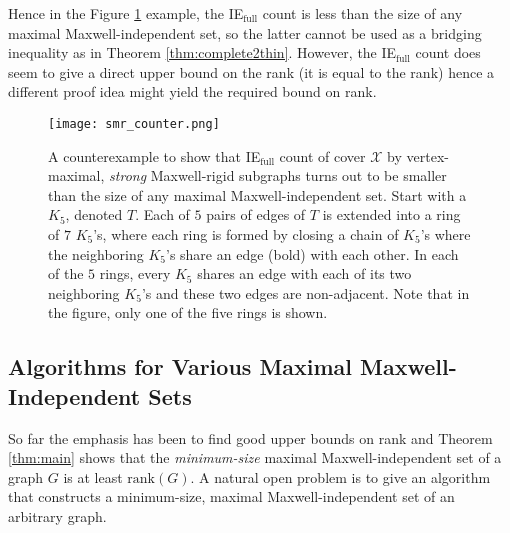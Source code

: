 \documentclass[10pt]{article}
\def\X{\mathcal {X}}
\begin{document}
\medskip\noindent 
Hence in the Figure \ref{smr_counter} example, the IE$_{\text{full}}$ count is less than the size of any maximal Maxwell-independent set, so the latter cannot be used as a bridging inequality
as in Theorem \ref{thm:complete2thin}.
However, the IE$_{\text{full}}$ count does seem to give a direct upper bound on the rank (it is equal to the rank) hence a different proof idea might yield the required bound on rank.
\begin{center}
\begin{figure}[!h]
\begin{center}
\texttt{[image: smr\_counter.png]}
\end{center}
\caption[A counterexample to show that IE$_{\text{full}}$ count of cover $\X$ by vertex-maximal, {\em strong} Maxwell-rigid subgraphs turns out to be smaller than the size of any maximal Maxwell-independent set.]{A counterexample to show that IE$_{\text{full}}$ count of cover $\X$ by vertex-maximal, {\em strong} Maxwell-rigid subgraphs turns out to be smaller than the size of any maximal Maxwell-independent set.
Start with a $K_5$, denoted $T$. Each of $5$ pairs of edges of $T$ is extended into a ring of $7$ $K_5$'s, where each ring is formed by closing a chain of $K_5$'s where the neighboring $K_5$'s share an edge (bold) with each other. In each
of the $5$ rings, every $K_5$ shares an edge with each of its two neighboring $K_5$'s and these two edges are non-adjacent. Note that in the figure, only one of the five rings is shown.}
\label{smr_counter}
\end{figure}
\end{center}

\subsection{Algorithms for Various Maximal Maxwell-Independent Sets}
So far the emphasis has been to find good upper bounds on rank and Theorem \ref{thm:main} shows that the {\it minimum-size} maximal Maxwell-independent set of a graph $G$ is at least $\text{rank}(G)$. A natural open problem is to give an algorithm that constructs a minimum-size,
maximal Maxwell-independent set of an arbitrary graph.
\end{document}
